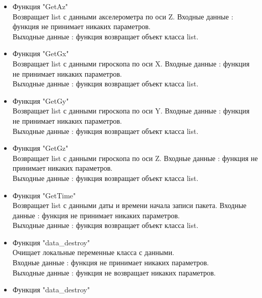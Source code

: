 \documentclass[a4document]{article}
\begin{document}
{\begin{itemize}
\begin{itemize}
                Входные данные : функция не принимает никаких параметров. \\ 
                Выходные данные : функция возвращает объект класса list.
            \item Функция "GetAz" \\
                Возвращает list с данными акселерометра по оси Z.
                Входные данные : функция не принимает никаких параметров. \\ 
                Выходные данные : функция возвращает объект класса list.
            \item Функция "GetGx" \\
                Возвращает list с данными гироскопа по оси X.
                Входные данные : функция не принимает никаких параметров. \\ 
                Выходные данные : функция возвращает объект класса list.
            \item Функция "GetGy" \\
                Возвращает list с данными гироскопа по оси Y.
                Входные данные : функция не принимает никаких параметров. \\ 
                Выходные данные : функция возвращает объект класса list.
            \item Функция "GetGz" \\
                Возвращает list с данными гироскопа по оси Z.
                Входные данные : функция не принимает никаких параметров. \\ 
                Выходные данные : функция возвращает объект класса list.
            \newpage
            \item Функция "GetTime" \\
                Возвращает list с данными даты и времени начала записи пакета.
                Входные данные : функция не принимает никаких параметров. \\ 
                Выходные данные : функция возвращает объект класса list.
            \item Функция "data\_destroy" \\
                Очищает локальные переменные класса с данными. \\
                Входные данные : функция не принимает никаких параметров. \\ 
                Выходные данные : функция не возвращает никаких параметров.
            \item Функция "data\_destroy" \\

\end{itemize}
\end{itemize}}
\end{document}
